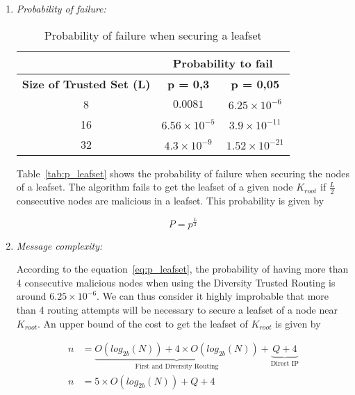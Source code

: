   \begin{enumerate}
    \item{\textit{Probability of failure:}}
  
  \begin{table}
    \centering
    \footnotesize
    \begin{tabular}{|c|c|c|}
      \cline{2-3}
      \multicolumn{1}{c|}{}&  \multicolumn{2}{c|}{\textbf{Probability to fail}} \\ \cline{2-3}
      \hline
      \textbf{Size of Trusted Set (L)} & \textbf{p = 0,3} & \textbf{p = 0,05} \\
      \hline \hline
      8 &  $0.0081$              & $6.25 \times 10^{-6}$  \\
      \hline
      16 & $6.56 \times 10^{-5}$ & $ 3.9 \times 10^{-11}$ \\
      \hline
      32 & $4.3 \times 10^{-9}$  & $ 1.52 \times 10^{-21} $  \\
      \hline
    \end{tabular}
    \caption{Probability of failure when securing a leafset}
    \label{tab:p_leafset}
  \end{table}
  
  Table~\eqref{tab:p_leafset} shows the probability of failure when securing the
  nodes of a leafset. The algorithm fails to get the leafset of a given node
  $K_{root}$ if $\frac{L}{2}$ consecutive nodes are malicious in a leafset. This
  probability is given by
  
  \begin{equation} \label{eq:p_leafset}
    P= p^{\frac{L}{2}}
  \end{equation}
  
    \item{\textit{Message complexity:}}

      According to the equation~\eqref{eq:p_leafset}, the probability of having
more than 4 consecutive malicious nodes when using the Diversity Trusted
Routing is around $6.25 \times 10^{-6}$. We can thus consider it highly
improbable that more than 4 routing attempts will be necessary  to secure a
leafset of a node near $K_{root}$. An upper bound of the cost to get the
leafset of $K_{root}$ is given by
      
      \begin{align} \label{eq:p_leafset}
        n &= \underbrace{O(log_{2b}(N)) + 4 \times O(log_{2b}(N))}_\text{First
and Diversity Routing} + \underbrace{Q+4}_\text{Direct IP} \\
        n &= 5 \times O(log_{2b}(N)) +  Q+4 
      \end{align}
      

\end{enumerate}
